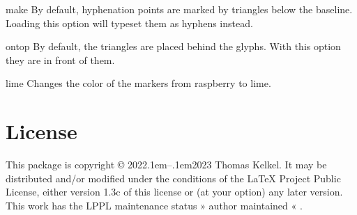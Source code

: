 \documentclass[
ukenglish,%
twoside=false,%
fontsize=10pt,%
bibliography=totoc,%
numbers=autoenddot,%
headings=normalsize,%
overfullrule,%
headings=optiontotoc,%
]
{scrartcl}
\newcommand*{\qq}[1]{%
    »%
    #1%
    «%
}
\newcommand*{\textnote}[1]{%
    {%
        \ttfamily%
        \char174{}%
        #1%
        \char174{}%
    }%
}
\begin{document}

\textnote{make}By default, hyphenation points are marked by triangles below the baseline. Loading this option will typeset them as hyphens instead.


\textnote{ontop}By default, the triangles are placed behind the glyphs. With this option they are in front of them.


\textnote{lime}Changes the color of the markers from raspberry to lime.

\section{License}

This package is copyright © 2022\kern.1em–\kern.1em2023 Thomas Kelkel. It may be distributed and/or modified under the conditions of the LaTeX Project Public License, either version 1.3c of this license or (at your option) any later version. This work has the LPPL maintenance status \qq{author maintained}.
\end{document}

